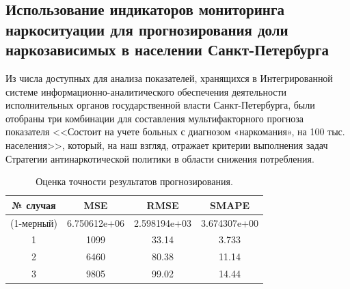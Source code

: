\documentclass[a4paper,14pt]{article}
\begin{document}
\subsection{Использование индикаторов мониторинга наркоситуации для прогнозирования доли наркозависимых в населении Санкт-Петербурга}
Из числа доступных для анализа показателей, хранящихся в Интегрированной системе информационно-аналитического обеспечения деятельности исполнительных органов государственной власти Санкт-Петербурга, были отобраны три комбинации для составления мультифакторного прогноза 
показателя <<Состоит на учете больных с диагнозом «наркомания», на 100 тыс. населения>>, который, на наш взгляд, отражает критерии выполнения задач Стратегии антинаркотической политики в области снижения потребления.

\begin{table}[bhtp]
	\caption{Оценка точности результатов прогнозирования.}
	\begin{center}
		\begin{tabular}{ | c | c | c | c | }
			\hline
			№ случая & MSE & RMSE & SMAPE \\
			\hline
			(1-мерный) & 6.750612e+06 & 2.598194e+03 & 3.674307e+00  \\
			\hline
			1 & 1099 & 33.14 & 3.733  \\
			\hline
			2 & 6460 & 80.38 & 11.14  \\
			\hline
			3 & 9805 & 99.02 & 14.44  \\
			\hline
		\end{tabular}		
	\end{center}
	\label{table:WM-error-multi}	
\end{table}
\end{document}
